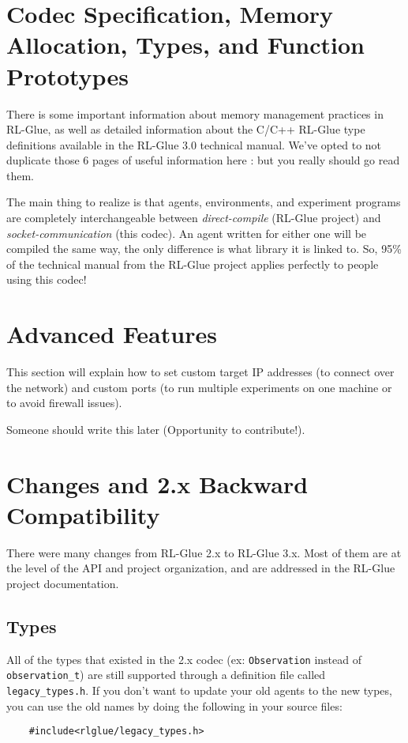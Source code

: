 \documentclass[11pt]{article}
\begin{document}
\section{Codec Specification, Memory Allocation, Types, and Function Prototypes}
There is some important information about memory management practices in RL-Glue, as well as detailed information about the C/C++ RL-Glue type definitions available in the 
RL-Glue 3.0 technical manual.  We've opted to not duplicate those 6 pages of useful information here : but you really should go read them.

The main thing to realize is that agents, environments, and experiment programs are completely interchangeable between \textit{direct-compile} (RL-Glue project) and \textit{socket-communication}
(this codec).  An agent written for either one will be compiled the same way, the only difference is what library it is linked to.  So, 95\% of the technical manual from the RL-Glue project applies 
perfectly to people using this codec! 




\section{Advanced Features}
This section will explain how to set custom target IP addresses (to connect over the network) and custom ports (to run multiple experiments on one machine or to avoid firewall issues).

Someone should write this later (Opportunity to contribute!).

\section{Changes and 2.x Backward Compatibility}
There were many changes from RL-Glue 2.x to RL-Glue 3.x.  Most of them are at the level of the API and project organization, and are addressed in the RL-Glue 
project documentation.

\subsection{Types}
All of the types that existed in the 2.x codec (ex: \texttt{Observation} instead of \texttt{observation\_t}) are still supported through a definition file called 
\texttt{legacy\_types.h}.  If you don't want to update your old agents to the new types, you can use the old names by doing the following in your source files:
\begin{verbatim}
	#include<rlglue/legacy_types.h>
\end{verbatim}
\end{document}
